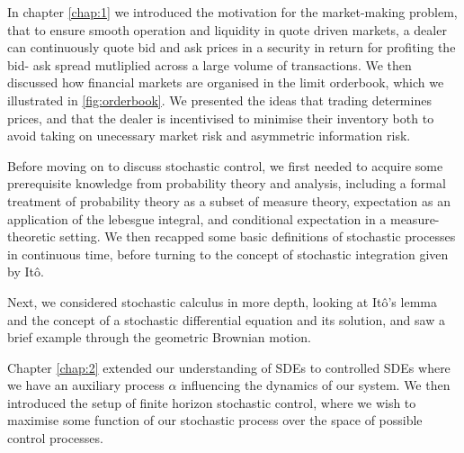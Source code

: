 
In chapter \ref{chap:1} we introduced the motivation for the market-making problem,
that to ensure smooth operation and liquidity in quote driven markets, a dealer can 
continuously quote bid and ask prices in a security in return for profiting the bid-
ask spread mutliplied across a large volume of transactions. We then discussed how 
financial markets are organised in the limit orderbook, which we illustrated in 
\ref{fig:orderbook}. We presented the ideas that trading determines prices, and that 
the dealer is incentivised to minimise their inventory both to avoid taking on 
unecessary market risk and asymmetric information risk.

Before moving on to discuss stochastic control, we first needed to acquire some 
prerequisite knowledge from probability theory and analysis, including a formal 
treatment of probability theory as a subset of measure theory, expectation as an
application of the lebesgue integral, and conditional expectation in a measure-theoretic
setting. We then recapped some basic definitions of stochastic processes in continuous
time, before turning to the concept of stochastic integration given by It\^{o}.

Next, we considered stochastic calculus in more depth, looking at It\^{o}'s lemma 
and the concept of a stochastic differential equation and its solution, and saw a brief 
example through the geometric Brownian motion.

Chapter \ref{chap:2} extended our understanding of SDEs to controlled SDEs where we 
have an auxiliary process $\alpha$ influencing the dynamics of our system. We then 
introduced the setup of finite horizon stochastic control, where we wish to maximise 
some function of our stochastic process over the space of possible control processes.

